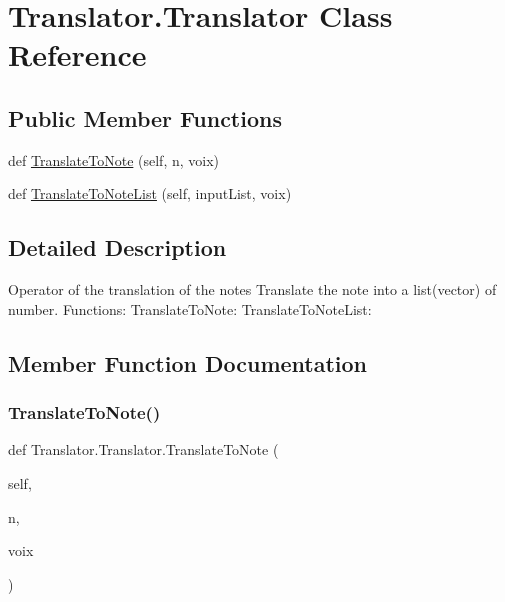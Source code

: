 \hypertarget{class_translator_1_1_translator}{}\section{Translator.\+Translator Class Reference}
\label{class_translator_1_1_translator}
\subsection*{Public Member Functions}
\begin{DoxyCompactItemize}
\item 
def \mbox{\hyperlink{class_translator_1_1_translator_a01afe3034d7b7ce89e397fe024359944}{Translate\+To\+Note}} (self, n, voix)
\item 
def \mbox{\hyperlink{class_translator_1_1_translator_a20b6862fd7e26a69c6eb22fa784b7fe7}{Translate\+To\+Note\+List}} (self, input\+List, voix)
\end{DoxyCompactItemize}


\subsection{Detailed Description}
\begin{DoxyVerb}Operator of the translation of the notes
Translate the note into a list(vector) of number.
Functions:
    TranslateToNote:
    TranslateToNoteList:
\end{DoxyVerb}
 

\subsection{Member Function Documentation}
\mbox{\label{class_translator_1_1_translator_a01afe3034d7b7ce89e397fe024359944}} 
\subsubsection{\texorpdfstring{Translate\+To\+Note()}{TranslateToNote()}}
{\footnotesize\ttfamily def Translator.\+Translator.\+Translate\+To\+Note (\begin{DoxyParamCaption}\item[{}]{self,  }\item[{}]{n,  }\item[{}]{voix }\end{DoxyParamCaption})}

